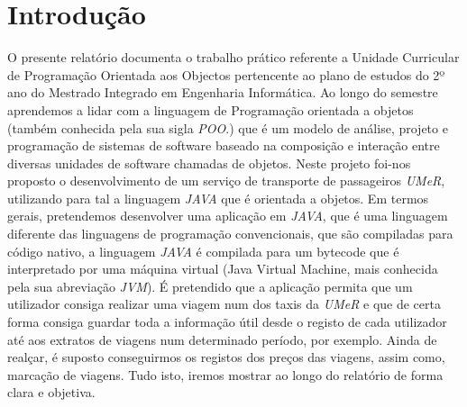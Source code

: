 \chapter{Introdução}
\label{cap:intro}

O presente relatório documenta o trabalho prático referente a Unidade Curricular de Programação Orientada aos Objectos pertencente ao plano de estudos do 2º ano do Mestrado Integrado em Engenharia Informática.
Ao longo do semestre aprendemos a lidar com a linguagem de Programação orientada a objetos (também conhecida pela sua sigla \textit{POO}.) que é um modelo de análise, projeto e programação de sistemas de software baseado na composição e interação entre diversas unidades de software chamadas de objetos.  
Neste projeto foi-nos proposto o desenvolvimento de um serviço de transporte de passageiros \textit{UMeR}, utilizando para tal a linguagem \textit{JAVA} que é orientada a objetos.
Em termos gerais, pretendemos desenvolver uma aplicação em \textit{JAVA}, que é uma linguagem diferente das linguagens de programação convencionais, que são compiladas para código nativo, a linguagem \textit{JAVA} é compilada para um bytecode que é interpretado por uma máquina virtual (Java Virtual Machine, mais conhecida pela sua abreviação \textit{JVM}).
É pretendido que a aplicação permita que um utilizador consiga realizar uma viagem num dos taxis da \textit{UMeR} e que de certa forma consiga guardar toda a informação útil desde o registo de cada utilizador até aos extratos de viagens num determinado período, por exemplo. Ainda de realçar, é suposto conseguirmos os registos dos preços das viagens, assim como, marcação de viagens.
Tudo isto, iremos mostrar ao longo do relatório de forma clara e objetiva.


